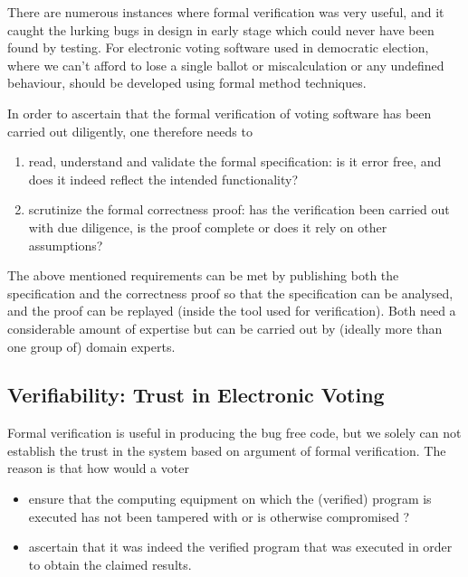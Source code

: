    There are numerous instances where formal verification 
	was very useful, and it caught the lurking bugs in design in early 
	stage which could never have been found by testing. For 
	electronic voting software used in democratic election, where we 
	can't afford to lose a single ballot or miscalculation 
	or any undefined behaviour, should be developed 
	using formal method techniques. 
	
	In order to ascertain that the formal verification of voting software has been 
	carried out diligently, one therefore needs to
	\begin{enumerate}
	\item read, understand and validate the formal specification: is it 
	error free, and does it indeed reflect the intended functionality?
	\item scrutinize the formal correctness proof: has the verification
	been carried out with due diligence, is the proof complete or does
	it rely on other assumptions?
	
	\end{enumerate}			
	
	\noindent
	The above mentioned requirements can be met by publishing both the
	specification and the correctness proof so that the specification
	can be analysed, and the proof can be replayed (inside the tool used for 
	verification). Both need a
	considerable amount of expertise but can be carried out by (ideally
	more than one group of) domain experts.
	

	
	  
	 
		
 \subsection{Verifiability: Trust in Electronic Voting}
  Formal verification is useful in producing the 
   bug free code, but we solely can not 
   establish the trust in the system based on argument of 
   formal verification. The reason is that how would a voter
   \begin{itemize}
   \item ensure that the computing equipment on which the (verified)
	program is executed has not been tampered with or is otherwise
	compromised ?
	\item ascertain that it was indeed the verified program that was
	executed in order to obtain the claimed results.
   \end{itemize}
   
